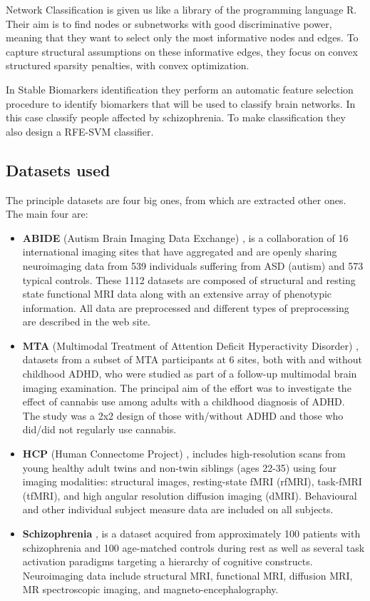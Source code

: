 Network Classification is given us like a library of the programming language R. Their aim is to find nodes or subnetworks with good discriminative power, meaning that they want to select only the most informative nodes and edges. To capture structural assumptions on these informative edges, they focus on convex structured sparsity penalties, with convex optimization. 
\vspace{0.5cm}

In Stable Biomarkers identification they perform an automatic feature selection procedure to identify biomarkers that will be used to classify brain networks. In this case classify people affected by schizophrenia. To make classification they also design a RFE-SVM classifier. 

\subsection{Datasets used}
The principle datasets are four big ones, from which are extracted other ones. The main four are:
\begin{itemize}
	\item \textbf{ABIDE} (Autism Brain Imaging Data Exchange) \cite{Cameron2013TheNB}, is a collaboration of 16 international imaging sites that have aggregated and are openly sharing neuroimaging data from 539 individuals suffering from ASD (autism) and 573 typical controls. These 1112 datasets are composed of structural and resting state functional MRI data along with an extensive array of phenotypic information. All data are preprocessed and different types of preprocessing are described in the web site.
	\item \textbf{MTA} (Multimodal Treatment of Attention Deficit Hyperactivity Disorder) \cite{mta}, datasets from a subset of MTA participants at 6 sites, both with and without childhood ADHD, who were studied as part of a follow-up multimodal brain imaging examination. The principal aim of the effort was to investigate the effect of cannabis use among adults with a childhood diagnosis of ADHD. The study was a 2x2 design of those with/without ADHD and those who did/did not regularly use cannabis.
	\item \textbf{HCP} (Human Connectome Project) \cite{Woolrich2001TemporalAI}, includes high-resolution scans from young healthy adult twins and non-twin siblings (ages 22-35) using four imaging modalities: structural images, resting-state fMRI (rfMRI), task-fMRI (tfMRI), and high angular resolution diffusion imaging (dMRI). Behavioural and other individual subject measure data are included on all subjects. 
	\item \textbf{Schizophrenia} \cite{schizo}, is a dataset acquired from approximately 100 patients with schizophrenia and 100 age-matched controls during rest as well as several task activation paradigms targeting a hierarchy of cognitive constructs. Neuroimaging data include structural MRI, functional MRI, diffusion MRI, MR spectroscopic imaging, and magneto-encephalography.
\end{itemize}

